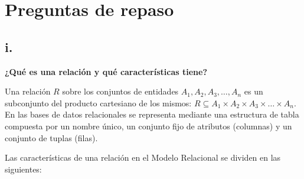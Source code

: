 \section{Preguntas de repaso}
\subsection*{i. }

\textbf{¿Qué es una relación y qué características tiene?}

Una relación $R$ sobre los conjuntos de entidades $A_1, A_2, A_3, \dots, A_n$ es un subconjunto del producto cartesiano de los mismos: $R \subseteq A_1 \times A_2 \times A_3 \times \dots \times A_n$. En las bases de datos relacionales se representa mediante una estructura de tabla compuesta por un nombre único, un conjunto fijo de atributos (columnas) y un conjunto de tuplas (filas).

Las características de una relación en el Modelo Relacional se dividen en las siguientes:

